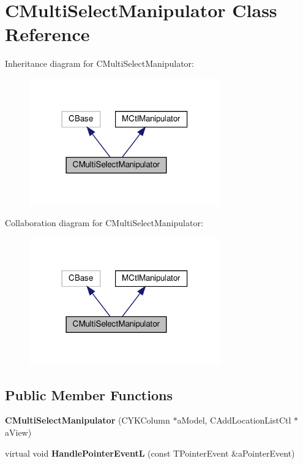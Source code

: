 \hypertarget{classCMultiSelectManipulator}{}\section{C\+Multi\+Select\+Manipulator Class Reference}
\label{classCMultiSelectManipulator}


Inheritance diagram for C\+Multi\+Select\+Manipulator\+:
\nopagebreak
\begin{figure}[H]
\begin{center}
\leavevmode
\includegraphics[width=234pt]{classCMultiSelectManipulator__inherit__graph}
\end{center}
\end{figure}


Collaboration diagram for C\+Multi\+Select\+Manipulator\+:
\nopagebreak
\begin{figure}[H]
\begin{center}
\leavevmode
\includegraphics[width=234pt]{classCMultiSelectManipulator__coll__graph}
\end{center}
\end{figure}
\subsection*{Public Member Functions}
\begin{DoxyCompactItemize}
\item 
\mbox{\label{classCMultiSelectManipulator_aa44d6f631c563f3676e1b45f2adea35c}} 
{\bfseries C\+Multi\+Select\+Manipulator} (C\+Y\+K\+Column $\ast$a\+Model, C\+Add\+Location\+List\+Ctl $\ast$a\+View)
\item 
\mbox{\label{classCMultiSelectManipulator_a54077536ee6578e6ced1d2ba51385a0b}} 
virtual void {\bfseries Handle\+Pointer\+EventL} (const T\+Pointer\+Event \&a\+Pointer\+Event)
\end{DoxyCompactItemize}
